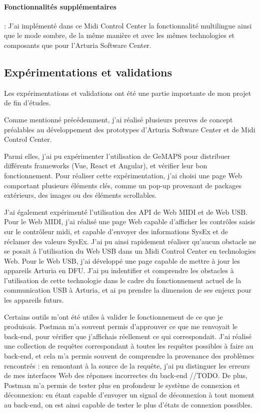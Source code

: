 \documentclass[francais]{rapportPFE}  %
\begin{document}
\paragraph{Fonctionnalités supplémentaires}:
J'ai implémenté dans ce Midi Control Center la fonctionnalité multilingue ainsi que le mode sombre, de la même manière et avec les mêmes technologies et composants que pour l'Arturia Software Center.

\subsection{Expérimentations et validations}

Les expérimentations et validations ont été une partie importante de mon projet de fin d'études.

Comme mentionné précédemment, j'ai réalisé plusieurs preuves de concept préalables au développement des prototypes d'Arturia Software Center et de Midi Control Center.

Parmi elles, j'ai pu expérimenter l'utilisation de GeMAPS pour distribuer différents frameworks (Vue, React et Angular), et vérifier leur bon fonctionnement. Pour réaliser cette expérimentation, j'ai choisi une page Web comportant plusieurs éléments clés, comme un pop-up provenant de packages extérieurs, des images ou des éléments scrollables.

J'ai également expérimenté l'utilisation des API de Web MIDI et de Web USB.
Pour le Web MIDI, j'ai réalisé une page Web capable d'afficher les contrôles saisis sur le contrôleur midi, et capable d'envoyer des informations SysEx et de réclamer des valeurs SysEx. J'ai pu ainsi rapidement réaliser qu'aucun obstacle ne se posait à l'utilisation du Web USB dans un Midi Control Center en technologies Web.
Pour le Web USB, j'ai développé une page capable de mettre à jour les appareils Arturia en DFU. J'ai pu indentifier et comprendre les obstacles à l'utilisation de cette technologie dans le cadre du fonctionnement actuel de la communication USB à Arturia, et ai pu prendre la dimension de ses enjeux pour les appareils futurs.

Certains outils m'ont été utiles à valider le fonctionnement de ce que je produisais. Postman m'a souvent permis d'approuver ce que me renvoyait le back-end, pour vérifier que j'affichais réellement ce qui correspondait. J'ai réalisé une collection de requêtes correspondant à toutes les requêtes possibles à faire au back-end, et cela m'a permis souvent de comprendre la provenance des problèmes rencontrés : en remontant à la source de la requête, j'ai pu distinguer les erreurs de mes interfaces Web des réponses incorrectes du back-end //TODO. De plus, Postman m'a permis de tester plus en profondeur le système de connexion et déconnexion: en étant capable d'envoyer un signal de déconnexion à tout moment au back-end, on est ainsi capable de tester le plus d'états de connexion possibles.
\end{document}
